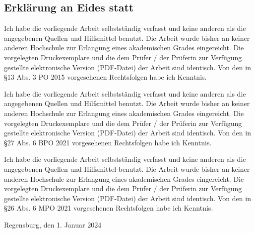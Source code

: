 \documentclass[numbers=noenddot,bibliography=totoc,12pt,sfdefaults=false]{scrartcl}
\newcommand{\submittedDate}{1. Januar 2024}
\begin{document}
\newpage
\pagestyle{empty}

\subsection*{Erklärung an Eides statt}
Ich habe die vorliegende Arbeit selbstständig verfasst und keine anderen als die angegebenen Quellen und Hilfsmittel benutzt. Die Arbeit wurde bisher an keiner anderen Hochschule zur Erlangung eines akademischen Grades eingereicht. Die vorgelegten Druckexemplare und die dem Prüfer / der Prüferin zur Verfügung gestellte elektronische Version (PDF-Datei) der Arbeit sind identisch. Von den in §13 Abs. 3 PO 2015 vorgesehenen Rechtsfolgen habe ich Kenntnis.

Ich habe die vorliegende Arbeit selbstständig verfasst und keine anderen als die angegebenen Quellen und Hilfsmittel benutzt. Die Arbeit wurde bisher an keiner anderen Hochschule zur Erlangung eines akademischen Grades eingereicht. Die vorgelegten Druckexemplare und die dem Prüfer / der Prüferin zur Verfügung gestellte elektronische Version (PDF-Datei) der Arbeit sind identisch. Von den in §27 Abs. 6 BPO 2021 vorgesehenen Rechtsfolgen habe ich Kenntnis.

Ich habe die vorliegende Arbeit selbstständig verfasst und keine anderen als die angegebenen Quellen und Hilfsmittel benutzt. Die Arbeit wurde bisher an keiner anderen Hochschule zur Erlangung eines akademischen Grades eingereicht. Die vorgelegten Druckexemplare und die dem Prüfer / der Prüferin zur Verfügung gestellte elektronische Version (PDF-Datei) der Arbeit sind identisch. Von den in §26 Abs. 6 MPO 2021 vorgesehenen Rechtsfolgen habe ich Kenntnis.


\vspace{4cm}
\begin{flushright}
    Regensburg, den \submittedDate
\end{flushright}
\end{document}
